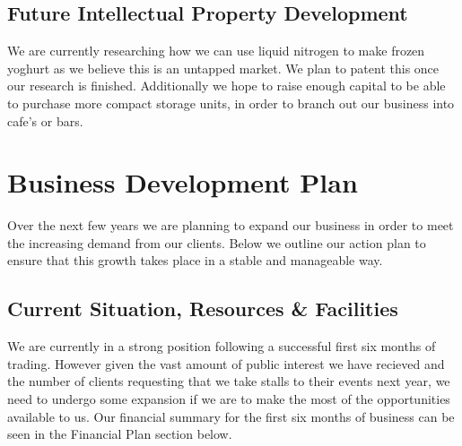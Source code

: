 \documentclass{article}
\begin{document}
  \subsection{Future Intellectual Property Development}

  We are currently researching how we can use liquid nitrogen to make frozen yoghurt as we believe this is an untapped market. We plan to patent this once our research is finished. Additionally we hope to raise enough capital to be able to purchase more compact storage units, in order to branch out our business into cafe's or bars.


\section{Business Development Plan}

  Over the next few years we are planning to expand our business in order to meet the increasing demand from our clients. Below we outline our action plan to ensure that this growth takes place in a stable and manageable way.

  \subsection{Current Situation, Resources \& Facilities}

  We are currently in a strong position following a successful first six months of trading. However given the vast amount of public interest we have recieved and the number of clients requesting that we take stalls to their events next year, we need to undergo some expansion if we are to make the most of the opportunities available to us. Our financial summary for the first six months of business can be seen in the Financial Plan section below. \\
\end{document}
